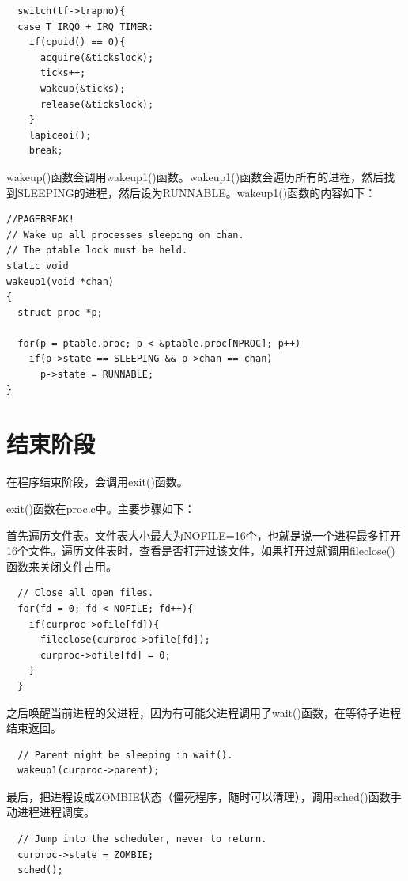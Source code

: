 \begin{verbatim}
  switch(tf->trapno){
  case T_IRQ0 + IRQ_TIMER:
    if(cpuid() == 0){
      acquire(&tickslock);
      ticks++;
      wakeup(&ticks);
      release(&tickslock);
    }
    lapiceoi();
    break;
\end{verbatim}

wakeup()函数会调用wakeup1()函数。wakeup1()函数会遍历所有的进程，然后找到SLEEPING的进程，然后设为RUNNABLE。wakeup1()函数的内容如下：

\begin{verbatim}
//PAGEBREAK!
// Wake up all processes sleeping on chan.
// The ptable lock must be held.
static void
wakeup1(void *chan)
{
  struct proc *p;

  for(p = ptable.proc; p < &ptable.proc[NPROC]; p++)
    if(p->state == SLEEPING && p->chan == chan)
      p->state = RUNNABLE;
}
\end{verbatim}


\section{结束阶段}

在程序结束阶段，会调用exit()函数。

exit()函数在proc.c中。主要步骤如下：

首先遍历文件表。文件表大小最大为NOFILE=16个，也就是说一个进程最多打开16个文件。遍历文件表时，查看是否打开过该文件，如果打开过就调用fileclose()函数来关闭文件占用。

\begin{verbatim}
  // Close all open files.
  for(fd = 0; fd < NOFILE; fd++){
    if(curproc->ofile[fd]){
      fileclose(curproc->ofile[fd]);
      curproc->ofile[fd] = 0;
    }
  }
\end{verbatim}

之后唤醒当前进程的父进程，因为有可能父进程调用了wait()函数，在等待子进程结束返回。

\begin{verbatim}
  // Parent might be sleeping in wait().
  wakeup1(curproc->parent);
\end{verbatim}

最后，把进程设成ZOMBIE状态（僵死程序，随时可以清理），调用sched()函数手动进程进程调度。

\begin{verbatim}
  // Jump into the scheduler, never to return.
  curproc->state = ZOMBIE;
  sched();
\end{verbatim}
